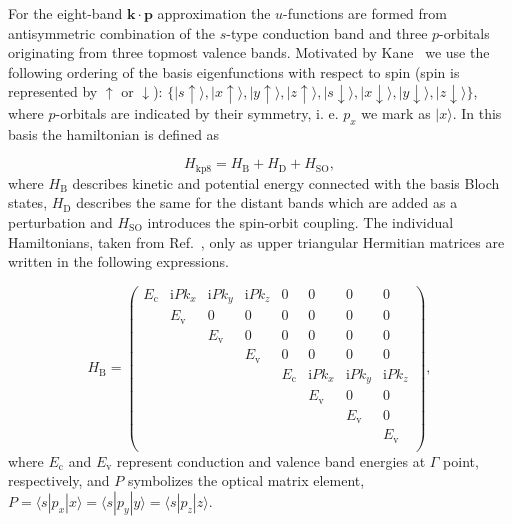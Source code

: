 For the eight-band $\mathbf{k\cdot p}$ approximation the $u$-functions are formed from antisymmetric combination of the $s$-type conduction band and three $p$-orbitals originating from three topmost valence bands. Motivated by Kane~\citep{Kane} we use the following ordering of the basis eigenfunctions with respect to spin (spin is represented by $\uparrow$ or $\downarrow$): $\{|s\uparrow\rangle, |x\uparrow\rangle, |y\uparrow\rangle, |z\uparrow\rangle, |s\downarrow\rangle, |x\downarrow\rangle, |y\downarrow\rangle, |z\downarrow\rangle\}$, where $p$-orbitals are indicated by their symmetry, i. e. $p_x$ we mark as $|x\rangle$. In this basis the hamiltonian is defined as 

\begin{equation}
H_{\mathrm{kp8}}=H_\mathrm{B}+H_\mathrm{D}+H_\mathrm{SO},\label{eq:ham8kp}%
\end{equation}
where $H_{\mathrm{B}}$ describes kinetic and potential energy connected with the basis Bloch states, $H_{\mathrm{D}}$ describes the same for the distant bands which are added as a perturbation and $H_{\mathrm{SO}}$ introduces the spin-orbit coupling. The individual Hamiltonians, taken from Ref.~\citep{t_stier}, only as upper triangular Hermitian matrices are written in the following expressions.

\begin{equation}
H_\mathrm{B}=
\begin{pmatrix}
E_\mathrm{c}& \mathrm{i}Pk_x& \mathrm{i}Pk_y& \mathrm{i}Pk_z& 0& 0& 0& 0\\
& E_\mathrm{v}& 0& 0& 0& 0& 0& 0\\
& & E_\mathrm{v}& 0& 0& 0& 0& 0\\
& & & E_\mathrm{v}& 0& 0& 0& 0\\
& & & & E_\mathrm{c}& \mathrm{i}Pk_x& \mathrm{i}Pk_y& \mathrm{i}Pk_z\\
& & & & & E_\mathrm{v}& 0& 0\\
& & & & & & E_\mathrm{v}& 0\\
& & & & & & & E_\mathrm{v}\\
\end{pmatrix},
\end{equation}
where $E_\mathrm{c}$ and $E_\mathrm{v}$ represent conduction and valence band energies at $\Gamma$ point, respectively, and $P$ symbolizes the optical matrix element, $P=\langle s|p_x|x\rangle=\langle s|p_y|y\rangle=\langle s|p_z|z\rangle$.

